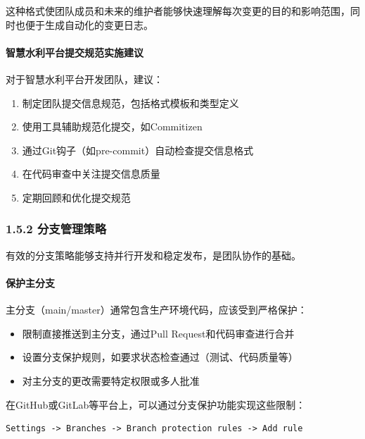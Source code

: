 这种格式使团队成员和未来的维护者能够快速理解每次变更的目的和影响范围，同时也便于生成自动化的变更日志。

\paragraph{智慧水利平台提交规范实施建议}\label{ux667aux6167ux6c34ux5229ux5e73ux53f0ux63d0ux4ea4ux89c4ux8303ux5b9eux65bdux5efaux8bae}

对于智慧水利平台开发团队，建议：

\begin{enumerate}
\def\labelenumi{\arabic{enumi}.}
\tightlist
\item
  制定团队提交信息规范，包括格式模板和类型定义
\item
  使用工具辅助规范化提交，如Commitizen
\item
  通过Git钩子（如pre-commit）自动检查提交信息格式
\item
  在代码审查中关注提交信息质量
\item
  定期回顾和优化提交规范
\end{enumerate}

\subsubsection{1.5.2
分支管理策略}\label{ux5206ux652fux7ba1ux7406ux7b56ux7565}

有效的分支策略能够支持并行开发和稳定发布，是团队协作的基础。

\paragraph{保护主分支}\label{ux4fddux62a4ux4e3bux5206ux652f}

主分支（main/master）通常包含生产环境代码，应该受到严格保护：

\begin{itemize}
\tightlist
\item
  限制直接推送到主分支，通过Pull Request和代码审查进行合并
\item
  设置分支保护规则，如要求状态检查通过（测试、代码质量等）
\item
  对主分支的更改需要特定权限或多人批准
\end{itemize}

在GitHub或GitLab等平台上，可以通过分支保护功能实现这些限制：

\begin{lstlisting}
Settings -> Branches -> Branch protection rules -> Add rule
\end{lstlisting}

